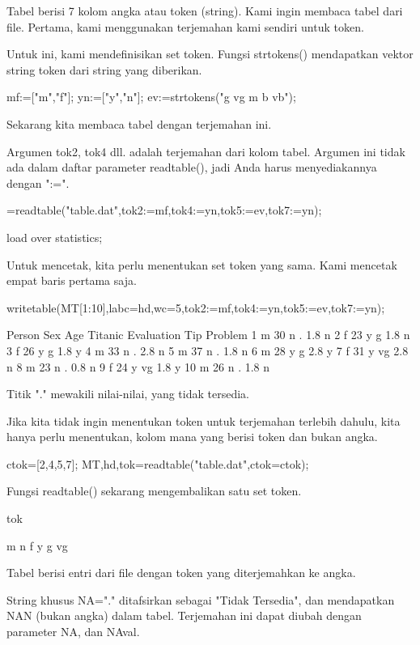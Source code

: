 \documentclass{article}
\begin{document}
Tabel berisi 7 kolom angka atau token (string). Kami ingin membaca
tabel dari file. Pertama, kami menggunakan terjemahan kami sendiri
untuk token.


Untuk ini, kami mendefinisikan set token. Fungsi strtokens()
mendapatkan vektor string token dari string yang diberikan.


\>mf:=["m","f"]; yn:=["y","n"]; ev:=strtokens("g vg m b vb");


Sekarang kita membaca tabel dengan terjemahan ini.


Argumen tok2, tok4 dll. adalah terjemahan dari kolom tabel. Argumen
ini tidak ada dalam daftar parameter readtable(), jadi Anda harus
menyediakannya dengan ":=".


=readtable("table.dat",tok2:=mf,tok4:=yn,tok5:=ev,tok7:=yn);

\>load over statistics;


Untuk mencetak, kita perlu menentukan set token yang sama. Kami
mencetak empat baris pertama saja.


\>writetable(MT[1:10],labc=hd,wc=5,tok2:=mf,tok4:=yn,tok5:=ev,tok7:=yn);


     Person  Sex  Age Titanic Evaluation  Tip Problem
          1    m   30       n          .  1.8       n
          2    f   23       y          g  1.8       n
          3    f   26       y          g  1.8       y
          4    m   33       n          .  2.8       n
          5    m   37       n          .  1.8       n
          6    m   28       y          g  2.8       y
          7    f   31       y         vg  2.8       n
          8    m   23       n          .  0.8       n
          9    f   24       y         vg  1.8       y
         10    m   26       n          .  1.8       n

Titik "." mewakili nilai-nilai, yang tidak tersedia.


Jika kita tidak ingin menentukan token untuk terjemahan terlebih
dahulu, kita hanya perlu menentukan, kolom mana yang berisi token dan
bukan angka.


\>ctok=[2,4,5,7]; {MT,hd,tok}=readtable("table.dat",ctok=ctok);


Fungsi readtable() sekarang mengembalikan satu set token.


\>tok


    m
    n
    f
    y
    g
    vg

Tabel berisi entri dari file dengan token yang diterjemahkan ke angka.


String khusus NA="." ditafsirkan sebagai "Tidak Tersedia", dan
mendapatkan NAN (bukan angka) dalam tabel. Terjemahan ini dapat diubah
dengan parameter NA, dan NAval.
\end{document}
